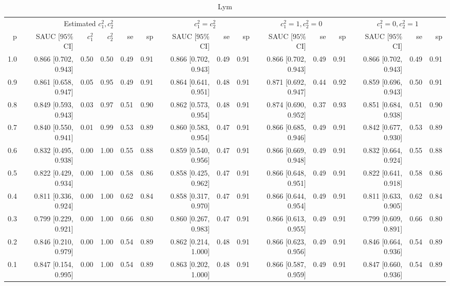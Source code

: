 \begin{table}

\caption{Lym}
\centering
\begin{tabular}[t]{rrrrrrrrrrrrrrr}
\toprule
\multicolumn{1}{c}{ } & \multicolumn{5}{c}{Estimated $c_1^2, c_2^2$} & \multicolumn{3}{c}{$c_1^2 = c_2^2$} & \multicolumn{3}{c}{$c_1^2 = 1, c_2^2 = 0$} & \multicolumn{3}{c}{$c_1^2 = 0, c_2^2 = 1$} \\
\cmidrule(l{3pt}r{3pt}){2-6} \cmidrule(l{3pt}r{3pt}){7-9} \cmidrule(l{3pt}r{3pt}){10-12} \cmidrule(l{3pt}r{3pt}){13-15}
p & SAUC [$95\%$ CI] & $c_1^2$ & $c_2^2$ & se & sp & SAUC [$95\%$ CI] & se & sp & SAUC [$95\%$ CI] & se & sp & SAUC [$95\%$ CI] & se & sp\\
\midrule
1.0 & 0.866 [0.702, 0.943] & 0.50 & 0.50 & 0.49 & 0.91 & 0.866 [0.702, 0.943] & 0.49 & 0.91 & 0.866 [0.702, 0.943] & 0.49 & 0.91 & 0.866 [0.702, 0.943] & 0.49 & 0.91\\
0.9 & 0.861 [0.658, 0.947] & 0.05 & 0.95 & 0.49 & 0.91 & 0.864 [0.641, 0.951] & 0.48 & 0.91 & 0.871 [0.692, 0.947] & 0.44 & 0.92 & 0.859 [0.696, 0.943] & 0.50 & 0.91\\
0.8 & 0.849 [0.593, 0.943] & 0.03 & 0.97 & 0.51 & 0.90 & 0.862 [0.573, 0.954] & 0.48 & 0.91 & 0.874 [0.690, 0.952] & 0.37 & 0.93 & 0.851 [0.684, 0.938] & 0.51 & 0.90\\
0.7 & 0.840 [0.550, 0.941] & 0.01 & 0.99 & 0.53 & 0.89 & 0.860 [0.583, 0.954] & 0.47 & 0.91 & 0.866 [0.685, 0.946] & 0.49 & 0.91 & 0.842 [0.677, 0.930] & 0.53 & 0.89\\
0.6 & 0.832 [0.495, 0.938] & 0.00 & 1.00 & 0.55 & 0.88 & 0.859 [0.540, 0.956] & 0.47 & 0.91 & 0.866 [0.669, 0.948] & 0.49 & 0.91 & 0.832 [0.664, 0.924] & 0.55 & 0.88\\
0.5 & 0.822 [0.429, 0.934] & 0.00 & 1.00 & 0.58 & 0.86 & 0.858 [0.425, 0.962] & 0.47 & 0.91 & 0.866 [0.648, 0.951] & 0.49 & 0.91 & 0.822 [0.641, 0.918] & 0.58 & 0.86\\
0.4 & 0.811 [0.336, 0.924] & 0.00 & 1.00 & 0.62 & 0.84 & 0.858 [0.317, 0.970] & 0.47 & 0.91 & 0.866 [0.644, 0.954] & 0.49 & 0.91 & 0.811 [0.633, 0.905] & 0.62 & 0.84\\
0.3 & 0.799 [0.229, 0.921] & 0.00 & 1.00 & 0.66 & 0.80 & 0.860 [0.267, 0.983] & 0.47 & 0.91 & 0.866 [0.613, 0.955] & 0.49 & 0.91 & 0.799 [0.609, 0.891] & 0.66 & 0.80\\
0.2 & 0.846 [0.210, 0.979] & 0.00 & 1.00 & 0.54 & 0.89 & 0.862 [0.214, 1.000] & 0.48 & 0.91 & 0.866 [0.623, 0.956] & 0.49 & 0.91 & 0.846 [0.664, 0.936] & 0.54 & 0.89\\
0.1 & 0.847 [0.154, 0.995] & 0.00 & 1.00 & 0.54 & 0.89 & 0.863 [0.202, 1.000] & 0.48 & 0.91 & 0.866 [0.587, 0.959] & 0.49 & 0.91 & 0.847 [0.660, 0.936] & 0.54 & 0.89\\
\bottomrule
\end{tabular}
\end{table}
